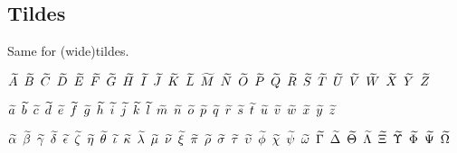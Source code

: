 \documentclass[noaddress, tikz]{nmd/article}
\begin{document}
\subsection*{Tildes} Same for (wide)tildes.

$\Atil \enskip \Btil \enskip \Ctil \enskip \Dtil \enskip \Etil \enskip \Ftil \enskip \Gtil \enskip \Htil \enskip \Itil \enskip \Jtil \enskip \Ktil \enskip \Ltil \enskip \Mtil \enskip \Ntil \enskip \Otil \enskip \Ptil \enskip \Qtil \enskip \Rtil \enskip \Stil \enskip \Ttil \enskip \Util \enskip \Vtil \enskip \Wtil \enskip \Xtil \enskip \Ytil \enskip \Ztil$

$\atil \enskip \btil \enskip \ctil \enskip \dtil \enskip \etil \enskip
\ftil \enskip \gtil \enskip \htil \enskip \itil \enskip \jtil \enskip
\ktil \enskip \ltil \enskip \mtil \enskip \ntil \enskip \otil \enskip
\ptil \enskip \qtil \enskip \rtil \enskip \stil \enskip \ttil \enskip
\util \enskip \vtil \enskip \wtil \enskip \xtil \enskip \ytil \enskip
\ztil$

$\alphatil \enskip \betatil \enskip \gammatil \enskip \deltatil \enskip \epsilontil \enskip \zetatil \enskip \etatil \enskip \thetatil \enskip \iotatil \enskip \kappatil \enskip \lambdatil \enskip \mutil \enskip \nutil \enskip \xitil \enskip \pitil \enskip \rhotil \enskip \sigmatil \enskip \tautil \enskip \upsilontil \enskip \phitil \enskip \chitil \enskip \psitil \enskip \omegatil \enskip \Gammatil \enskip \Deltatil \enskip \Thetatil \enskip \Lambdatil \enskip \Xitil \enskip \Upsilontil \enskip \Phitil \enskip \Psitil \enskip \Omegatil$

{\RaggedRight 
 

}
\end{document}
